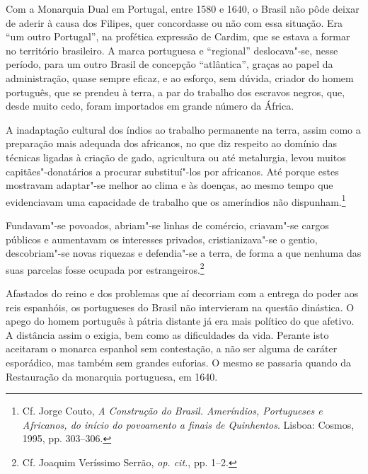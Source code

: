 Com a Monarquia Dual em Portugal, entre 1580 e 1640, o Brasil não
pôde deixar de aderir à causa dos Filipes, quer concordasse ou não com
essa situação. Era ``um outro Portugal'', na profética expressão
de Cardim, que se estava a formar no território brasileiro. A marca
portuguesa e ``regional'' deslocava"-se, nesse período, para um outro
Brasil de concepção ``atlântica'', graças ao papel da administração,
quase sempre eficaz, e ao esforço, sem dúvida, criador do homem
português, que se prendeu à terra, a par do trabalho dos escravos
negros, que, desde muito cedo, foram importados em grande número da África.

 A inadaptação cultural dos índios ao trabalho permanente na terra,
assim como a preparação mais adequada dos africanos, no que diz
respeito ao domínio das técnicas ligadas à criação de gado, agricultura
ou até metalurgia, levou muitos capitães"-donatários a procurar
substituí"-los por africanos. Até porque estes mostravam adaptar"-se
melhor ao clima e às doenças, ao mesmo tempo que evidenciavam uma
capacidade de trabalho que os ameríndios não dispunham.\footnote{ Cf. 
Jorge Couto, \textit{A Construção do Brasil. Ameríndios,
Portugueses e Africanos, do início do povoamento a finais de
Quinhentos}. Lisboa: Cosmos, 1995, pp. 303--306.}

 Fundavam"-se povoados, abriam"-se linhas de comércio, criavam"-se
cargos públicos e aumentavam os interesses privados, cristianizava"-se o
gentio, descobriam"-se novas riquezas e defendia"-se a terra, de forma a
que nenhuma das suas parcelas fosse ocupada por estrangeiros.\footnote{ Cf. Joaquim 
Veríssimo Serrão, \textit{op. cit.}, pp. 1--2.}

Afastados do reino e dos problemas que aí decorriam com a entrega do
poder aos reis espanhóis, os portugueses do Brasil não intervieram na
questão dinástica. O apego do homem português à pátria distante já era
mais político do que afetivo. A distância assim o exigia, bem como as
dificuldades da vida. Perante isto aceitaram o monarca espanhol sem
contestação, a não ser alguma de caráter esporádico, mas também sem
grandes euforias. O mesmo se passaria quando da Restauração da
monarquia portuguesa, em 1640. 

